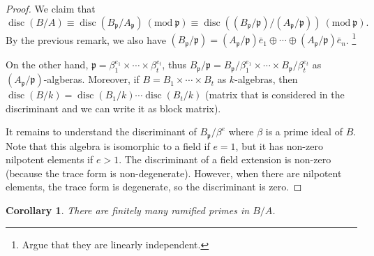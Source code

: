 \documentclass{tufte-handout} %
\newtheorem{cor}[thm]{Corollary}
\theoremstyle{definition}
\theoremstyle{remark}
\newcommand{\Mod}[1]{\ (\text{mod}\ #1)}
\newcommand{\lp}{{\mathfrak{p}}}
\DeclareMathOperator{\disc}{disc}
\begin{document}
\begin{proof}
	We claim that $$\disc(B/A) \equiv \disc(B_{\lp}/A_{\lp}) \Mod{\lp} \equiv \disc((B_{\lp}/\lp)/(A_{\lp}/\lp)) \Mod{\lp}.$$ By the previous remark, we also have $(B_{\lp}/\lp) = (A_{\lp}/\lp)\bar{e}_1 \oplus \cdots \oplus (A_{\lp}/\lp)\bar{e}_n$. \footnote{Argue that they are linearly independent.} 
	
	On the other hand, $\lp = \beta_1^{e_1}\times \cdots \times \beta_t^{e_t}$, thus $B_{\lp}/\lp = B_{\lp}/\beta_1^{e_1} \times \cdots \times B_{\lp}/\beta_t^{e_t}$ as $(A_{\lp}/\lp)$-algberas. Moreover, if $B = B_1 \times \cdots \times B_t$ as $k$-algebras, then $\disc(B/k) = \disc(B_1/k) \cdots \disc(B_t/k)$ (matrix that is considered in the discriminant and we can write it as block matrix).
	
	It remains to understand the discriminant of $B_{\lp}/\beta^e$ where $\beta$ is a prime ideal of $B$. Note that this algebra is isomorphic to a field if $e=1$, but it has non-zero nilpotent elements if $e > 1$. The discriminant of a field extension is non-zero (because the trace form is non-degenerate). However, when there are nilpotent elements, the trace form is degenerate, so the discriminant is zero.
\end{proof}
\begin{cor}
	There are finitely many ramified primes in $B/A$.
\end{cor}
\end{document}
